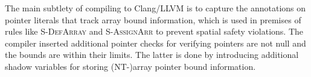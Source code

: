 


The main subtlety of compiling \checkedc to Clang/LLVM is to capture the annotations on pointer literals
that track array bound information, which is used in premises
of rules like \textsc{S-DefArray} and
  \textsc{S-AssignArr} to prevent spatial safety violations.
The \checkedc compiler \cite{li22checkedc} inserted additional pointer checks 
for verifying pointers are not null and the bounds are within their limits. 
The latter is done by introducing additional shadow variables for storing (NT-)array pointer bound information.

